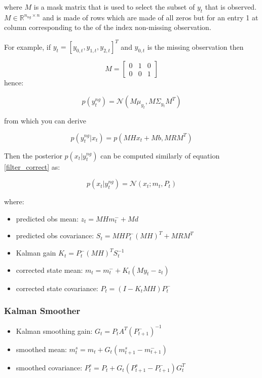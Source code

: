 \documentclass{article}
\begin{document}
where $M$ is a mask matrix that is used to select the subset of $y_t$ that is observed. $M \in \mathbb{R}^{n_{ng} \times n}$ and is made of rows which are made of all zeros but for an entry 1 at column corresponding to the of the index non-missing observation.

For example, if $y_t = [y_{0,t}, y_{1,t}, y_{2,t}]^T$ and $y_{0,t}$ is the missing observation then

$$ M = \left[\begin{array}{ccc}
    0 & 1 & 0 \\
    0 & 0 & 1
\end{array}\right]$$
hence:

$$ p(y^{ng}_t) = \mathcal{N}(M\mu_{y_t},  M\Sigma_{y_t}M^T)$$

from which you can derive

\begin{equation}\label{filter_correct_obs_missing}
    p(y^{ng}_t|x_t) = p(MHx_t + Mb, MRM^T) 
\end{equation}

Then the posterior $p(x_t|y_t^{ng})$ can be computed similarly of equation \ref{filter_correct} as:

\begin{equation}\label{filter_correct_missing}
 p(x_t|y^{ng}_t) = \mathcal{N}(x_t; m_t, P_t)   
\end{equation}
    
where:

\begin{itemize}
    \item predicted obs mean: $z_t = MHm_t^- + Md$   
    \item predicted obs covariance: $S_t = MHP_t^-(MH)^T + MRM^T$
    \item Kalman gain $K_t = P_t^-(MH)^TS_t^{-1}$ 
    \item corrected state mean: $m_t = m_t^- + K_t(My_t - z_t)$ 
    \item corrected state covariance: $P_t = (I-K_tMH)P_t^-$ 
\end{itemize}

\subsubsection{Kalman Smoother}

\begin{itemize}
    \item Kalman smoothing gain: $G_t = P_tA^T(P_{t+1}^-)^{-1}$
    \item smoothed mean: $m_t^s = m_t + G_t(m_{t+1}^s - m_{t+1}^-)$
    \item smoothed covariance: $P_t^s = P_t + G_t(P_{t+1}^s - P_{t+1}^-)G_t^T$
\end{itemize}
\end{document}
